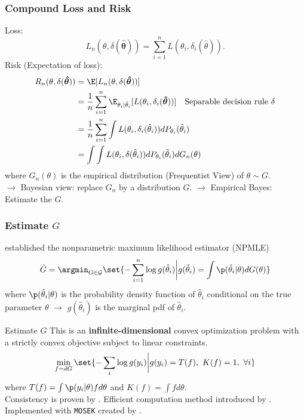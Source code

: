 \documentclass[10pt,mathserif,aspectratio=169]{beamer}
\begin{document}
\begin{frame}
  \frametitle{Compound Loss and Risk}
  Loss:
  \begin{equation*}
    L_n(\theta, \delta(\boldsymbol{\hat{\theta}})) = \sum_{i=1}^n L(\theta_i, \delta_i(\hat{\theta})).
  \end{equation*}
  Risk (Expectation of loss):
  \begin{align*}
    R_n(\theta, \delta(\boldsymbol{\hat{\theta}})) & = \E[L_n(\theta, \delta(\boldsymbol{\hat{\theta}}))]                                                                                                          \\
                                                   & = \frac{1}{n}\sum_{i=1}^n \E_{\theta_i|\hat{\theta}_i}[L(\theta_i, \delta_i(\boldsymbol{\hat{\theta}}))]         \quad \text{Separable decision rule } \delta \\
                                                   & = \frac{1}{n}\sum_{i=1}^n \int L(\theta_i, \delta_i(\hat{\theta}_i))dP_{\theta_i}(\hat{\theta}_i)                                                             \\
                                                   & = \int \int L(\theta_i, \delta(\hat{\theta}_i))dP_{\theta_i}(\hat{\theta}_i)dG_n(\theta)
  \end{align*}
  where $G_n(\theta)$ is the empirical distribution (Frequentist View) of $\theta \sim G$.
  \\$\rightarrow$ Bayesian view: replace $G_n$ by a distribution $G$. $\rightarrow$ Empirical Bayes: Estimate the $G$.
\end{frame}

\begin{frame}[fragile]\frametitle{Estimate $G$}
  \citet{kiefer1956consistency} established the nonparametric maximum likelihood estimator (NPMLE)
  \begin{equation*}
    \hat{G}=\argmin_{G\in \mathcal{G}} \set{-\sum_{i=1}^{n}\log g(\hat{\theta}_i)\bigg | g(\hat{\theta}_i)=\int  \p(\hat{\theta}_i |\theta)dG(\theta) }
  \end{equation*}
  where $\p(\hat{\theta}_i |\theta)$ is the probability density function of $\hat{\theta}_i$ conditional on the true parameter $\theta$ $\longrightarrow$ $g(\hat{\theta}_i)$ is the marginal pdf of $\hat{\theta}_i$.
\end{frame}

\begin{frame}[fragile]{Estimate $G$}
  This is an \textbf{infinite-dimensional} convex optimization problem with a strictly convex objective subject to linear constraints.
  \begin{equation*}
    \min_{f=dG}\set{-\sum_i \log g(y_i)\bigg |g(y_i) = T(f),\ K(f)=1,\ \forall i }
  \end{equation*}
  where $ T(f)=\int \p(y_i |\theta)f d\theta $ and  $K(f)= \int f d\theta$.\\

  Consistency is proven by \citet{kiefer1956consistency}. Efficient computation
  method introduced by \citet{koenker2014convex}. Implemented with \verb+MOSEK+
  created by \citet{andersen2010mosek}.
\end{frame}
\end{document}

